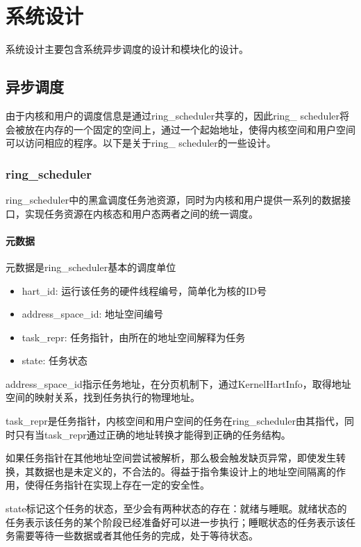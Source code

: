\chapter{系统设计}
\label{chap:SystemDesign}

系统设计主要包含系统异步调度的设计和模块化的设计。

\section{异步调度}

由于内核和用户的调度信息是通过ring\_scheduler共享的，因此ring\_ scheduler将会被放在内存的一个固定的空间上，通过一个起始地址，使得内核空间和用户空间可以访问相应的程序。以下是关于ring\_ scheduler的一些设计。

\subsection{ring\_scheduler}


ring\_scheduler中的黑盒调度任务池资源，同时为内核和用户提供一系列的数据接口，实现任务资源在内核态和用户态两者之间的统一调度。

\subsubsection{元数据}

元数据是ring\_scheduler基本的调度单位

\begin{itemize}
\item hart\_id: 运行该任务的硬件线程编号，简单化为核的ID号
\item address\_space\_id: 地址空间编号
\item task\_repr: 任务指针，由所在的地址空间解释为任务
\item state: 任务状态
\end{itemize}


address\_space\_id指示任务地址，在分页机制下，通过KernelHartInfo，取得地址空间的映射关系，找到任务执行的物理地址。

task\_repr是任务指针，内核空间和用户空间的任务在ring\_scheduler由其指代，同时只有当task\_repr通过正确的地址转换才能得到正确的任务结构。

如果任务指针在其他地址空间尝试被解析，那么极会触发缺页异常，即使发生转换，其数据也是未定义的，不合法的。得益于指令集设计上的地址空间隔离的作用，使得任务指针在实现上存在一定的安全性。


state标记这个任务的状态，至少会有两种状态的存在：就绪与睡眠。就绪状态的任务表示该任务的某个阶段已经准备好可以进一步执行；睡眠状态的任务表示该任务需要等待一些数据或者其他任务的完成，处于等待状态。

